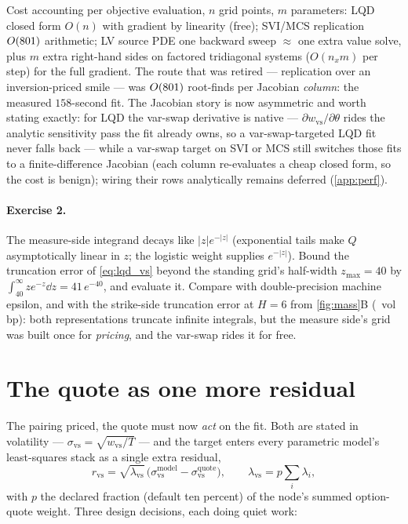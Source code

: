 \documentclass[11pt]{article}
\newcommand{\wvs}{w_{\mathrm{vs}}}
\newcommand{\svs}{\sigma_{\mathrm{vs}}}
\newcommand{\lam}{\lambda}
\begin{document}
\begin{perfbox}
Cost accounting per objective evaluation, $n$ grid points, $m$
parameters: LQD closed form $O(n)$ with gradient by linearity (free);
SVI/MCS replication $O(\text{801})$ arithmetic; LV source PDE one
backward sweep $\approx$ one extra value solve, plus $m$ extra
right-hand sides on factored tridiagonal systems ($O(n_x m)$ per step)
for the full gradient.  The route that was retired --- replication over
an inversion-priced smile --- was $O(\text{801})$ root-finds per
Jacobian \emph{column}: the measured $158$-second fit.  The Jacobian
story is now asymmetric and worth stating exactly: for LQD the var-swap
derivative is native --- $\partial\wvs/\partial\theta$ rides the analytic
sensitivity pass the fit already owns, so a var-swap-targeted LQD fit
never falls back --- while a var-swap target on SVI or MCS still switches
those fits to a finite-difference Jacobian (each column re-evaluates a
cheap closed form, so the cost is benign); wiring their rows analytically
remains deferred (\cref{app:perf}).
\end{perfbox}

\paragraph{Exercise 2.}
The measure-side integrand decays like $|z|e^{-|z|}$ (exponential tails
make $Q$ asymptotically linear in $z$; the logistic weight supplies
$e^{-|z|}$).  Bound the truncation error of \eqref{eq:lqd_vs} beyond the
standing grid's half-width $z_{\max}=40$ by
$\int_{40}^{\infty}ze^{-z}\dd z=41\,e^{-40}$, and evaluate it.  Compare
with double-precision machine epsilon, and with the strike-side
truncation error at $H=6$ from \cref{fig:mass}B (\vsrtruncsixbp\ vol
bp): both representations truncate infinite integrals, but the measure
side's grid was built once for \emph{pricing}, and the var-swap rides it
for free.

\section{The quote as one more residual}
\label{sec:penalty}

The pairing priced, the quote must now \emph{act} on the fit.  Both are
stated in volatility --- $\svs=\sqrt{\wvs/T}$ --- and the target enters
every parametric model's least-squares stack as a single extra residual,
\begin{equation}
r_{\mathrm{vs}}
=\sqrt{\lam_{\mathrm{vs}}}\,
\big(\svs^{\mathrm{model}}-\svs^{\mathrm{quote}}\big),
\qquad
\lam_{\mathrm{vs}}=p\sum_i\lam_i ,
\label{eq:resid}
\end{equation}
with $p$ the declared fraction (default ten percent) of the node's
summed option-quote weight.  Three design decisions, each doing quiet
work:
\end{document}
